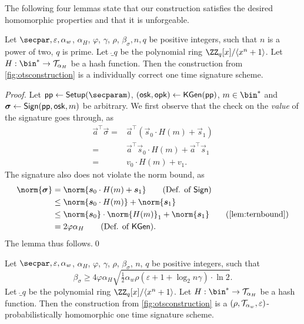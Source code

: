 The following four lemmas state that our construction satisfies the desired homomorphic properties and that it is unforgeable.
\begin{lemma}\label{lem:kots_ind_correct}
Let $\secpar, \varepsilon, \alpha_w$, $\alpha_H$, $\varphi$, $\gamma$, $\rho$, $\beta_\sigma,n,q$ be positive integers, such that $n$ is a power of two, $q$ is prime.
  Let $\ring_q$ be the polynomial ring $\ZZ_q[x]/\langle x^n+1\rangle$.
Let $H : \bin^* \to \tern_{\alpha_H}$ be a hash function.
  Then the construction from \autoref{fig:otsconstruction} is a individually correct one time signature scheme.
\end{lemma}
\begin{proof}
  Let $\params \gets \setup(\secparam)$, $(\mathsf{osk},\mathsf{opk}) \gets \mathsf{KGen}(\mathsf{pp})$, $m\in\bin^*$ and $\boldsymbol{\sigma} \gets \mathsf{Sign}(\mathsf{pp},\mathsf{osk},m)$ be arbitrary.
  We first observe that the check on the \emph{value} of the signature goes through, as
  \begin{align*}
    \vec{a}^\intercal\vec{\sigma}
    ={}&\vec{a}^\intercal(\vec{s}_0\cdot H(m) + \vec{s}_1)\tag{Def. of $\sign$}\\
    ={}&\vec{a}^\intercal\vec{s}_0\cdot H(m) + \vec{a}^\intercal\vec{s}_1 \tag{Distributivity}\\
    ={}&v_0\cdot H(m) + v_1. \tag{Def. of $\kgen$}
  \end{align*}
  The signature also does not violate the norm bound, as
  \begin{align*}
    \norm{\vec{\sigma}}
    ={}&\norm{\vec{s}_0\cdot H(m) + \vec{s}_1} \tag{Def. of $\sign$}\\
    \leq{}&\norm{\vec{s}_0\cdot H(m)} + \norm{\vec{s}_1}\\
    \leq{}&\norm{\vec{s}_0}\cdot\norm{H(m)}_1 + \norm{\vec{s}_1} \tag{\autoref{lem:ternbound}}\\
    ={}&2\varphi\alpha_H \tag{Def. of $\kgen$}.
  \end{align*}
  The lemma thus follows.\qed
\end{proof}


\begin{lemma}\label{lem:kots_correct}
Let $\secpar, \varepsilon, \alpha_w$, $\alpha_H$, $\varphi$, $\gamma$, $\rho$, $\beta_\sigma$, $n$, $q$ be positive integers, such that \[\beta_\sigma \geq 4\varphi\alpha_H\sqrt{\tfrac{1}{2}\alpha_w\rho(\varepsilon+1+\log_2n\gamma)\cdot\ln2}.\]
  Let $\ring_q$ be the polynomial ring $\ZZ_q[x]/\langle x^n+1\rangle$.
  Let $H : \bin^* \to \tern_{\alpha_H}$ be a hash function.
  Then the construction from \autoref{fig:otsconstruction} is a $(\rho,\mathcal{T}_{\alpha_w},\varepsilon)$-probabilistically homomorphic one time signature scheme.
\end{lemma}

